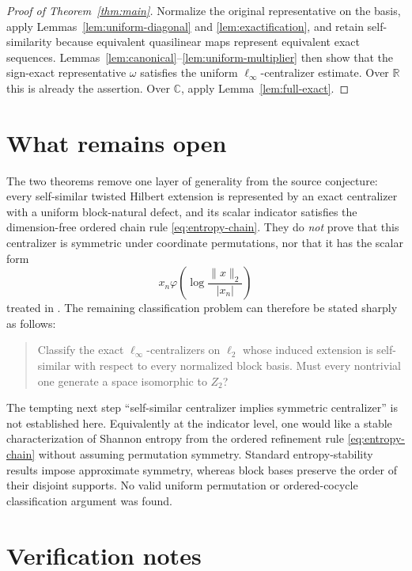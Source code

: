 \documentclass[11pt]{article}
\begin{document}
\begin{proof}[Proof of Theorem~\ref{thm:main}]
Normalize the original representative on the basis, apply
Lemmas~\ref{lem:uniform-diagonal} and \ref{lem:exactification}, and retain
self-similarity because equivalent quasilinear maps represent equivalent
exact sequences.  Lemmas~\ref{lem:canonical}--\ref{lem:uniform-multiplier}
then show that the sign-exact representative $\omega$ satisfies the uniform
$\ell_\infty$-centralizer estimate.  Over $\mathbb R$ this is already the
assertion.  Over $\mathbb C$, apply Lemma~\ref{lem:full-exact}.
\end{proof}

\section*{What remains open}

The two theorems remove one layer of generality from the source conjecture:
every self-similar twisted Hilbert extension is represented by an exact
centralizer with a uniform block-natural defect, and its scalar indicator
satisfies the dimension-free ordered chain rule
\eqref{eq:entropy-chain}.  They do \emph{not} prove that this centralizer is
symmetric under coordinate permutations, nor that it has the scalar form
\[
 x_n\varphi\!\left(\log\frac{\|x\|_2}{|x_n|}\right)
\]
treated in \cite{CDR}.  The remaining classification problem can therefore
be stated sharply as follows:

\begin{quote}
Classify the exact $\ell_\infty$-centralizers on $\ell_2$ whose induced
extension is self-similar with respect to every normalized block basis.
Must every nontrivial one generate a space isomorphic to $Z_2$?
\end{quote}

The tempting next step ``self-similar centralizer implies symmetric
centralizer'' is not established here.  Equivalently at the indicator level,
one would like a stable characterization of Shannon entropy from the ordered
refinement rule \eqref{eq:entropy-chain} without assuming permutation
symmetry.  Standard entropy-stability results impose approximate symmetry,
whereas block bases preserve the order of their disjoint supports.  No valid
uniform permutation or ordered-cocycle classification argument was found.

\section*{Verification notes}
\end{document}
